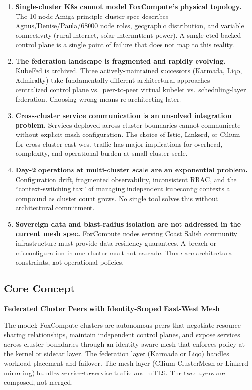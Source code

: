 \documentclass[11pt,letterpaper]{article}
\begin{document}
\begin{enumerate}
  \item \textbf{Single-cluster K8s cannot model FoxCompute's physical topology.} The 10-node Amiga-principle cluster spec describes Agnus/Denise/Paula/68000 node roles, geographic distribution, and variable connectivity (rural internet, solar-intermittent power). A single etcd-backed control plane is a single point of failure that does not map to this reality.

  \item \textbf{The federation landscape is fragmented and rapidly evolving.} KubeFed is archived. Three actively-maintained successors (Karmada, Liqo, Admiralty) take fundamentally different architectural approaches --- centralized control plane vs.\ peer-to-peer virtual kubelet vs.\ scheduling-layer federation. Choosing wrong means re-architecting later.

  \item \textbf{Cross-cluster service communication is an unsolved integration problem.} Services deployed across cluster boundaries cannot communicate without explicit mesh configuration. The choice of Istio, Linkerd, or Cilium for cross-cluster east-west traffic has major implications for overhead, complexity, and operational burden at small-cluster scale.

  \item \textbf{Day-2 operations at multi-cluster scale are an exponential problem.} Configuration drift, fragmented observability, inconsistent RBAC, and the ``context-switching tax'' of managing independent kubeconfig contexts all compound as cluster count grows. No single tool solves this without architectural commitment.

  \item \textbf{Sovereign data and blast-radius isolation are not addressed in the current mesh spec.} FoxCompute nodes serving Coast Salish community infrastructure must provide data-residency guarantees. A breach or misconfiguration in one cluster must not cascade. These are architectural constraints, not operational policies.
\end{enumerate}

\subsection{Core Concept}

\textbf{Federated Cluster Peers with Identity-Scoped East-West Mesh}

The model: FoxCompute clusters are autonomous peers that negotiate resource-sharing relationships, maintain independent control planes, and expose services across cluster boundaries through an identity-aware mesh that enforces policy at the kernel or sidecar layer. The federation layer (Karmada or Liqo) handles workload placement and failover. The mesh layer (Cilium ClusterMesh or Linkerd mirroring) handles service-to-service traffic and mTLS. The two layers are composed, not merged.
\end{document}
